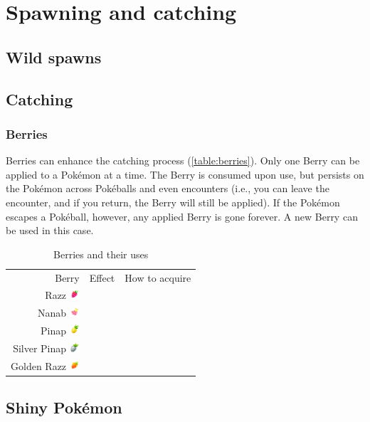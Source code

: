 \chapter{Spawning and catching}
\label{chap:spawn}

\section{Wild spawns}
\label{sec:spawns}

\section{Catching}
\label{sec:catch}

\subsection{Berries}
Berries can enhance the catching process (\autoref{table:berries}).
Only one Berry can be applied to a Pokémon at a time.
The Berry is consumed upon use, but persists on the Pokémon across Pokéballs
  and even encounters (i.e., you can leave the encounter, and if you return,
  the Berry will still be applied).
If the Pokémon escapes a Pokéball, however, any applied Berry is gone forever.
A new Berry can be used in this case.

\begin{table}[ht]
\begin{center}
\begin{tabular}{rll}
Berry & Effect & How to acquire \\
Razz \includegraphics[width=1em]{images/razz.png} & & \\
Nanab \includegraphics[width=1em]{images/nanab.png} & & \\
Pinap \includegraphics[width=1em]{images/pinap.png} & & \\
Silver Pinap \includegraphics[width=1em]{images/silverpinap.png} & &\\
Golden Razz \includegraphics[width=1em]{images/goldenrazz.png} & & \\
\end{tabular}
\end{center}
\caption{Berries and their uses}
\label{table:berries}
\end{table}

\section{Shiny Pokémon}
\label{sec:shiny}
